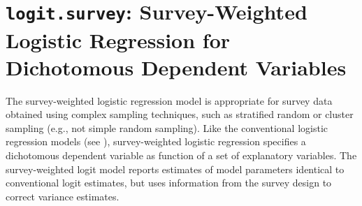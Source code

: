 \section{{\tt logit.survey}: Survey-Weighted Logistic Regression for Dichotomous Dependent Variables}
\label{logit.survey}

The survey-weighted logistic regression model is appropriate for 
survey data obtained using complex sampling techniques, such as 
stratified random or cluster sampling (e.g., not simple random 
sampling).  Like the conventional logistic regression models (see 
), survey-weighted logistic regression specifies a 
dichotomous dependent variable as function of a set of explanatory 
variables.  The survey-weighted logit model reports estimates of 
model parameters identical to conventional logit estimates, but uses 
information from the survey design to correct variance estimates.

